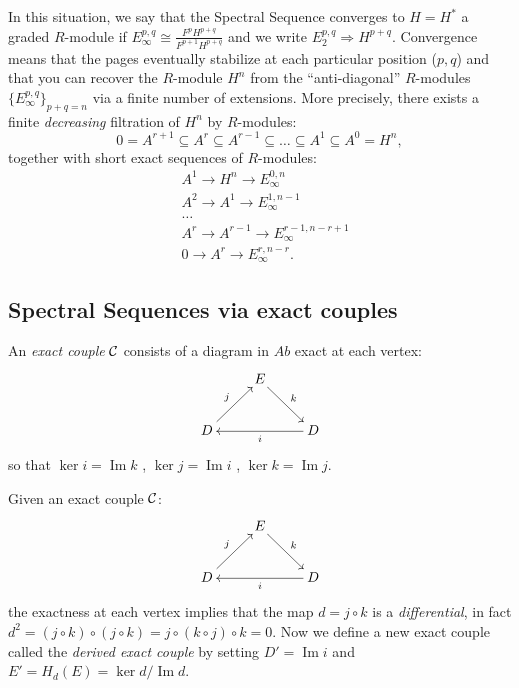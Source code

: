 \documentclass[../main.tex]{subfiles}
\begin{document}
In this situation, we say that the Spectral Sequence converges to $H=H^*$ a graded $R$-module if $E_{\infty}^{p,q} \cong \frac{F^pH^{p+q}}{F^{p+1}H^{p+q}}$ and we write
 $E_2^{p,q}\Rightarrow H^{p+q}$. Convergence means that the pages eventually stabilize at each particular position ($p,q$) and that  you can recover the $R$-module $H^n$ from the ``anti-diagonal'' $R$-modules $\{E_\infty^{p,q}\}_{p+q=n}$ via a finite number of extensions. More precisely, there exists a finite \emph{decreasing} filtration of $H^n$ by $R$-modules:
\[
0=A^{r+1}\subseteq A^r\subseteq A^{r-1}\subseteq\ldots\subseteq A^{1}\subseteq A^0=H^n,
\]
together with short exact sequences of $R$-modules:
\begin{align}
&A^{1}\to H^n \to E_\infty^{0,n}\label{equ:filtrationcohoonetotaldimension}\\
&A^{2}\to A^{1} \to E_\infty^{1,n-1}\nonumber\\
&\ldots\nonumber \\
&A^r\to A^{r-1}\to E_\infty^{r-1,n-r+1}\nonumber \\
&0\to A^r\to E_\infty^{r,n-r}.\nonumber
\end{align}






\subsection{Spectral Sequences via exact couples}


\begin{defn}
\label{def:exact-couple}
  An \emph{exact couple} $\mathcal{C}$ consists of a diagram in $Ab$ exact at each vertex:  
\[
\xymatrix{
&E \ar[rd]^k& \\
D\ar[ur]^j && D\ar[ll]^i 
}
\]
so that $\ker i= \ensuremath{\operatorname{Im}} k$ , $\ker j = \ensuremath{\operatorname{Im}} i$ , $\ker k = \ensuremath{\operatorname{Im}} j$.
 
\end{defn}
Given an exact couple $\mathcal{C}$:
\[
 \xymatrix{
&E \ar[rd]^k& \\
D\ar[ur]^j&& D\ar[ll]^i 
}
\]
the exactness at each vertex implies that the map $d = j \circ k$ is a
\emph{differential}, in fact $d^2 = (j \circ k) \circ (j \circ k) = j \circ (k \circ j) \circ k = 0$. Now we define a new exact couple called the \emph{derived exact couple} by setting $D'
=\ensuremath{\operatorname{Im}}i$ and $E' = H_d(E) = \ker d /\ensuremath{\operatorname{Im}}d$.
\end{document}
